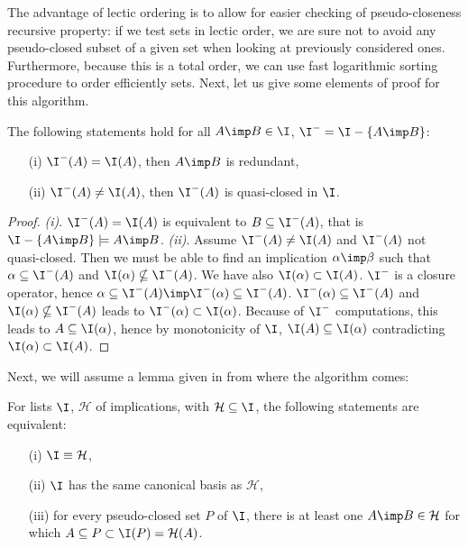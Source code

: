 \begin{figure}[ht]
	
\end{figure}

\vspace{1.2em}

The advantage of lectic ordering is to allow for easier checking of pseudo-closeness recursive property: if we test sets in lectic order,
we are sure not to avoid any pseudo-closed subset of a given set when
looking at previously considered ones. Furthermore, because this is 
a total order, we can use fast logarithmic sorting procedure to order 
efficiently sets. Next, let us give some elements of proof for this 
algorithm.


\begin{proposition} The following statements hold for all $A \imp B \in \I$, $\I^{-} = \I - \{ A \imp B \}$:
	\begin{itemize}
		\item[(i)] $\I^{-}(A) = \I(A)$, then $A \imp B$ is redundant,
		\item[(ii)] $\I^{-}(A) \neq \I(A)$, then $\I^{-}(A)$ is quasi-closed in $\I$.
	\end{itemize}
\end{proposition}

\begin{proof} \textit{(i)}. $\I^{-}(A) = \I(A)$ is equivalent to $B \subseteq \I^{-}(A)$, that is $\I - \{ A \imp B \} \models A \imp B$. \textit{(ii)}. Assume $\I^{-}(A) \neq \I(A)$ and $\I^{-}(A)$ not quasi-closed. Then we must be
able to find an implication $\alpha \imp \beta$ such that $\alpha \subseteq \I^{-}(A)$ and $ \I(\alpha) \nsubseteq \I^{-}(A)$. We have also $\I(\alpha) \subset \I(A)$. $\I^{-}$ is a closure operator, hence $\alpha \subseteq \I^{-}(A) \imp \I^{-}(\alpha) \subseteq \I^{-}(A)$. $\I^{-}(\alpha) \subseteq \I^{-}(A)$ and $ \I(\alpha) \nsubseteq \I^{-}(A)$ leads to $\I^{-}(\alpha) 
\subset \I(\alpha)$. Because of $\I^{-}$ computations, this leads to $A \subseteq \I(\alpha)$, hence by monotonicity of $\I$, $\I(A) \subseteq \I(\alpha)$ contradicting $\I(\alpha) \subset \I(A)$.

\end{proof}

Next, we will assume a lemma given in \cite{duquenne_variations_2007} from where
the algorithm comes:

\begin{lemma} For lists $\I$, $\mathcal{H}$ of implications, with $\mathcal{H} \subseteq \I$, the following statements are equivalent:
\begin{itemize}
	\item[(i)] $\I \equiv \mathcal{H}$,
	\item[(ii)] $\I$ has the same canonical basis as $\mathcal{H}$,
	\item[(iii)] for every pseudo-closed set $P$ of $\I$, there is at least
	one $A \imp B \in \mathcal{H}$ for which $A \subseteq P \subset \I(P) = \mathcal{H}(A)$.
\end{itemize}
\end{lemma}

